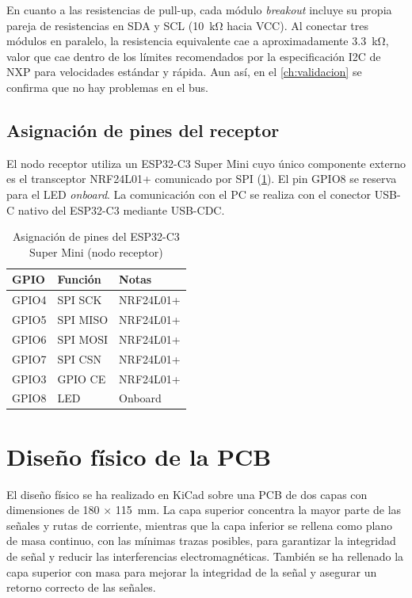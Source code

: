 En cuanto a las resistencias de pull-up, cada módulo \textit{breakout} incluye su propia
pareja de resistencias en SDA y SCL (\SI{10}{\kilo\ohm} hacia
VCC). Al conectar tres módulos en paralelo, la resistencia equivalente cae a
aproximadamente \SI{3.3}{\kilo\ohm}, valor que cae dentro de los límites
recomendados por la especificación I2C de NXP \cite{nxp_i2c} para velocidades
estándar y rápida. Aun así, en el \cref{ch:validacion} se confirma que no hay problemas en el bus.


\subsection{Asignación de pines del receptor}
\label{sec:pines_rx}

El nodo receptor utiliza un ESP32-C3 Super Mini cuyo único componente externo
es el transceptor NRF24L01+ comunicado por SPI (\cref{tab:pines_rx}). El pin
GPIO8 se reserva para el LED \textit{onboard}. La comunicación con el PC se realiza con el conector USB-C nativo
del ESP32-C3 mediante USB-CDC.

\begin{table}[H]
    \centering
    \caption{Asignación de pines del ESP32-C3 Super Mini (nodo receptor)}
    \label{tab:pines_rx}
    \footnotesize
    \begin{tabularx}{\linewidth}{l l X}
        \toprule
        \textbf{GPIO} & \textbf{Función} & \textbf{Notas} \\
        \midrule
        GPIO4 & SPI SCK  & NRF24L01+ \\
        GPIO5 & SPI MISO & NRF24L01+ \\
        GPIO6 & SPI MOSI & NRF24L01+ \\
        GPIO7 & SPI CSN  & NRF24L01+ \\
        GPIO3 & GPIO CE  & NRF24L01+ \\
        GPIO8 & LED      & Onboard \\
        \bottomrule
    \end{tabularx}
\end{table}


\section{Diseño físico de la PCB}
\label{sec:layout}

El diseño físico se ha realizado en KiCad \cite{kicad_pcbnew} sobre una PCB de
dos capas con dimensiones de 180 $\times$ \SI{115}{\milli\meter}. La capa superior
concentra la mayor parte de las señales y rutas de corriente, mientras que la
capa inferior se rellena como plano de masa continuo, con las mínimas trazas posibles, para garantizar la
integridad de señal y reducir las interferencias electromagnéticas. También se ha rellenado la capa superior con masa para mejorar la integridad de la señal y asegurar un retorno correcto de las señales.

